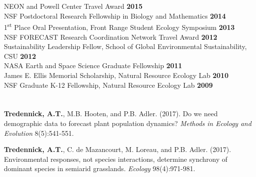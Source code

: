 \documentclass[margin,line]{resume}
\begin{document}
\begin{resume}
     \section{\textmd{\textsf{\color{MidnightBlue}{Fellowships \\and Awards}}}}
        		NEON and Powell Center Travel Award \hfill \textbf{2015}\vspace{.5mm}\\%
                NSF Postdoctoral Research Fellowship in Biology and Mathematics    \hfill \textbf{2014}\vspace{.5mm}\\%
                1\textsuperscript{st} Place Oral Presentation, Front Range Student Ecology Symposium  \hfill \textbf{2013}\vspace{.5mm}\\%
                NSF FORECAST Research Coordination Network Travel Award \hfill \textbf{2012}\vspace{.5mm}\\%
                Sustainability Leadership Fellow, School of Global Environmental Sustainability, CSU \hfill \textbf{2012}\vspace{.5mm}\\%
		NASA Earth and Space Science Graduate Fellowship  \hfill \textbf{2011}\vspace{.5mm}\\%
		James E. Ellis Memorial Scholarship, Natural Resource Ecology Lab  \hfill \textbf{2010}\vspace{.5mm}\\%
		NSF Graduate K-12 Fellowship, Natural Resource Ecology Lab                        \hfill\textbf{2009}%
   
      \section{\textmd{\textsf{\color{MidnightBlue}{Publications}}}}
      
      \textbf{Tredennick, A.T.}, M.B. Hooten,  and P.B. Adler. (2017). Do we need demographic data to forecast plant population dynamics? \emph{Methods in Ecology and Evolution} 8(5):541-551.

      \textbf{Tredennick, A.T.}, C. de Mazancourt, M. Loreau, and P.B. Adler. (2017). Environmental responses, not species interactions, determine synchrony of dominant species in semiarid grasslands. \emph{Ecology} 98(4):971-981.
      

\end{resume}
\end{document}
